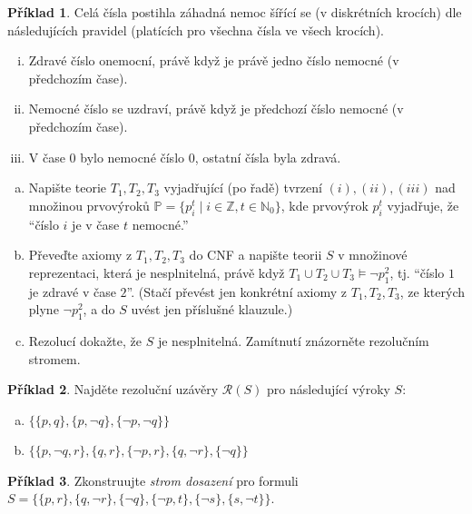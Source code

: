 \documentclass[a4paper]{article}
\theoremstyle{plain}
\theoremstyle{definition}
\newtheorem{problem}{Příklad}
\begin{document}
\medskip\begin{problem}
Celá čísla postihla záhadná nemoc šířící se (v diskrétních krocích) dle následujících pravidel (platících pro všechna čísla ve všech krocích).
\begin{enumerate}[(i)]
\item Zdravé číslo onemocní, právě když je právě jedno číslo nemocné (v předchozím čase).
\item Nemocné číslo se uzdraví, právě když je předchozí číslo nemocné (v předchozím čase).
\item V čase $0$ bylo nemocné číslo $0$, ostatní čísla byla zdravá.
\end{enumerate}
\begin{enumerate}[(a)]
\item Napište teorie $T_1, T_2, T_3$ vyjadřující (po řadě) tvrzení $(i), (ii), (iii)$ nad množinou prvovýroků $\mathbb{P}=\{p_i^t \mid i\in\mathbb{Z}, t\in\mathbb{N}_0\}$, kde prvovýrok $p_i^t$ vyjadřuje, že ``číslo $i$ je v čase $t$ nemocné.''
\item Převeďte axiomy z $T_1, T_2, T_3$ do CNF a napište teorii $S$ v množinové reprezentaci, která je nesplnitelná, právě když $T_1 \cup T_2 \cup T_3 \models \neg p_1^2$, tj. ``číslo $1$ je zdravé v čase $2$''. (Stačí převést jen konkrétní axiomy z $T_1,T_2,T_3$, ze kterých plyne $\neg p_1^2$, a do $S$ uvést jen příslušné klauzule.)
\item Rezolucí dokažte, že $S$ je nesplnitelná. Zamítnutí znázorněte rezolučním stromem.
\end{enumerate}
\end{problem}


\medskip\begin{problem}
    Najděte rezoluční uzávěry $\mathcal{R}(S)$ pro následující výroky $S$:
    \begin{enumerate}[(a)]
        \item $\{\{p,q\},\{p,\neg q\},\{\neg p,\neg q\}\}$
        \item $\{\{p,\neg q,r\},\{q,r\},\{\neg p, r\},\{q,\neg r\},\{\neg q\}\}$
    \end{enumerate}
\end{problem}
    
    
\medskip\begin{problem}
    Zkonstruujte \emph{strom dosazení} pro formuli $S=\{\{p,r\},\{q,\neg r\},\{\neg q\},\{\neg p,t\},\{\neg s\},\{s,\neg t\}\}$.
\end{problem}
\end{document}
